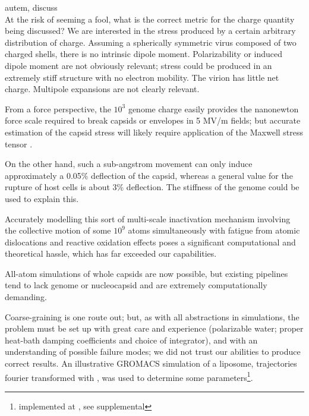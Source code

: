 \documentclass[paper.tex]{subfiles}
\begin{document}
\begin{autem}
	autem, discuss\\
	At the risk of seeming a fool, what is the correct metric for the charge quantity being discussed? We are interested in the stress produced by a certain arbitrary distribution of charge. Assuming a spherically symmetric virus composed of two charged shells, there is no intrinsic dipole moment. Polarizability or induced dipole moment are not obviously relevant; stress could be produced in an extremely stiff structure with no electron mobility. The virion has little net charge. Multipole expansions are not clearly relevant.
\end{autem}
\begin{multicols}{1}
From a force perspective, the $10^3$ genome charge easily provides the nanonewton force scale required\cite{Bacteriophage2004} to break capsids or envelopes in 5 MV/m fields; but accurate estimation of the capsid stress will likely require application of the Maxwell stress tensor \cite{Electrostatic2013}\cite{Deformation1991}.

On the other hand, such a sub-angstrom movement can only induce approximately a 0.05\% deflection of the capsid, whereas a general value for the rupture of host cells is about 3\% deflection\cite{Electromechanical1989}. The stiffness of the genome could be used to explain this. 

Accurately modelling this sort of multi-scale inactivation mechanism involving the collective motion of some $10^9$ atoms simultaneously with fatigue from atomic dislocations\cite{Physical2010} and reactive oxidation effects poses a significant computational and theoretical hassle, which has far exceeded our capabilities.

All-atom simulations of whole capsids are now possible, but existing pipelines tend to lack genome or nucleocapsid\cite{Mesoscale2020}\cite{Physical2017} and are extremely computationally demanding.

Coarse-graining is one route out; but, as with all abstractions in simulations, the problem must be set up with great care and experience (polarizable water; proper heat-bath damping coefficients and choice of integrator)\cite{Membrane2016}\cite{Determining2014}, and with an understanding of possible failure modes; we did not trust our abilities to produce correct results. An illustrative GROMACS simulation of a liposome, trajectories fourier transformed with \cite{TRAVIS2011}, was used to determine some parameters\footnote{implemented at , see supplemental}.


\end{multicols}
\end{document}
